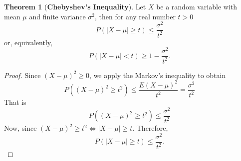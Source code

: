 \documentclass[12pt,a4paper]{report}
\theoremstyle{definition}
\newtheorem{thm}{Theorem}[section]
\theoremstyle{plain}
\theoremstyle{definition}
\begin{document}
\begin{thm}[\textbf{Chebyshev's Inequality}]
Let $X$ be a random variable with mean $\mu$ and finite variance $\sigma^2$, then for any real number $t>0$ \[P(|X-\mu|\geq t)\leq \frac{\sigma^2}{t^2}\]
or, equivalently,  \[P(|X-\mu|<t)\geq 1-\frac{\sigma^2}{t^2}.\]
\end{thm}

\begin{proof}
Since $(X - \mu)^2 \geq 0$, we apply the Markov's inequality to obtain 
\[P\left((X-\mu)^2\geq t^2\right)  \leq \frac{E(X-\mu)^2}{t^2}=\frac{\sigma^2}{t^2}\]
That is  \[P\left((X-\mu)^2\geq t^2\right)  \leq \frac{\sigma^2}{t^2}\]
Now, since  $(X-\mu)^2\geq t^2  \iff |X-\mu|\geq t$. Therefore, \[P(|X-\mu|\geq t) \leq \frac{\sigma^2}{t^2}.\]
\end{proof}
\end{document}
